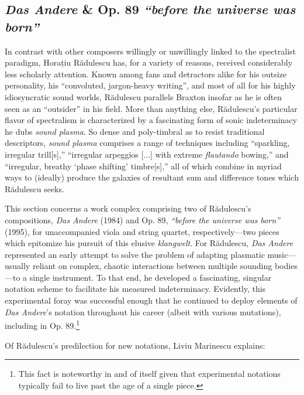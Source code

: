 \subsection{\textit{Das Andere} \& Op. 89 \textit{``before the universe was born''}}

        In contrast with other composers willingly or unwillingly linked to the spectralist paradigm, Horațiu Rădulescu has, for a variety of reasons, received considerably less scholarly attention. Known among fans and detractors alike for his outsize personality, his ``convoluted, jargon-heavy writing'', and most of all for his highly idiosyncratic sound worlds, Rădulescu parallels Braxton insofar as he is often seen as an ``outsider'' in his field.\autocite{Suckling_2018} More than anything else, Rădulescu's particular flavor of spectralism is characterized by a fascinating form of sonic indeterminacy he dubs \textit{sound plasma}. So dense and poly-timbral as to resist traditional descriptors, \textit{sound plasma} comprises a range of techniques including ``sparkling, irregular trill[s],'' ``irregular arpeggios [...] with extreme \textit{flautando} bowing,'' and ``irregular, breathy `phase shifting' timbre[s],'' all of which combine in myriad ways to (ideally) produce the galaxies of resultant sum and difference tones which Rădulescu seeks.\autocite{Heery_2016}
                
        This section concerns a work complex comprising two of Rădulescu's compositions, \textit{Das Andere} (1984) and Op. 89, \textit{``before the universe was born''} (1995), for unaccompanied viola and string quartet, respectively---two pieces which epitomize his pursuit of this elusive \textit{klangwelt}. For R\u{a}dulescu, \textit{Das Andere} represented an early attempt to solve the problem of adapting plasmatic music---usually reliant on complex, chaotic interactions between multiple sounding bodies---to a single instrument.\autocite[10]{Marinescu}  To that end, he developed a fascinating, singular notation scheme to facilitate his measured indeterminacy. Evidently, this experimental foray was successful enough that he continued to deploy elements of \textit{Das Andere}'s notation throughout his career (albeit with various mutations), including in Op. 89.\footnote{This fact is noteworthy in and of itself given that experimental notations typically fail to live past the age of a single piece.} 

        Of R\u{a}dulescu's predilection for new notations, Liviu Marinescu explains:

